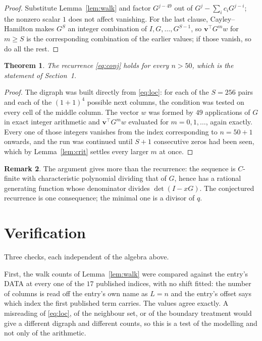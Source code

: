 \documentclass[11pt,a4paper]{article}
\theoremstyle{plain}
\newtheorem{theorem}{Theorem}
\theoremstyle{definition}
\newtheorem{remark}[theorem]{Remark}
\begin{document}
\begin{proof}
Substitute Lemma~\ref{lem:walk} and factor $G^{j-49}$ out of
$G^{j}-\sum_ic_iG^{j-i}$; the nonzero scalar $1$ does not affect
vanishing. For the last clause, Cayley--Hamilton makes $G^{S}$ an integer combination of
$I,G,\dots,G^{S-1}$, so $\mathbf{v}^{\!\top}G^{m}w$ for $m\ge S$ is the corresponding
combination of the earlier values; if those vanish, so do all the rest.
\end{proof}

\begin{theorem}
The recurrence \eqref{eq:conj} holds for every $n>50$, which is the statement of
Section~1.
\end{theorem}

\begin{proof}
The digraph was built directly from \eqref{eq:loc}: for each of the $S=256$ pairs and each
of the $(1+1)^{4}$ possible next columns, the condition was tested on every cell of
the middle column. The vector $w$ was formed by $49$ applications of $G$ in exact integer
arithmetic and $\mathbf{v}^{\!\top}G^{m}w$ evaluated for $m=0,1,\dots$, again exactly.
Every one of those integers vanishes from the index corresponding to $n=50+1$ onwards,
and the run was continued until $S+1$ consecutive zeros had been seen, which by
Lemma~\ref{lem:crit} settles every larger $m$ at once.
\end{proof}

\begin{remark}
The argument gives more than the recurrence: the sequence is $C$-finite with characteristic
polynomial dividing that of $G$, hence has a rational generating function whose denominator
divides $\det(I-xG)$. The conjectured recurrence is one consequence; the minimal one is a
divisor of $q$.
\end{remark}

\section{Verification}

Three checks, each independent of the algebra above.

First, the walk counts of Lemma~\ref{lem:walk} were compared against the entry's DATA at
every one of the $17$ published indices, with no shift fitted: the number of columns is
read off the entry's own name as $L=n$ and the entry's offset says which index the first
published term carries. The values agree exactly. A misreading of \eqref{eq:loc}, of the
neighbour set, or of the boundary treatment would give a different digraph and different
counts, so this is a test of the modelling and not only of the arithmetic.
\end{document}
